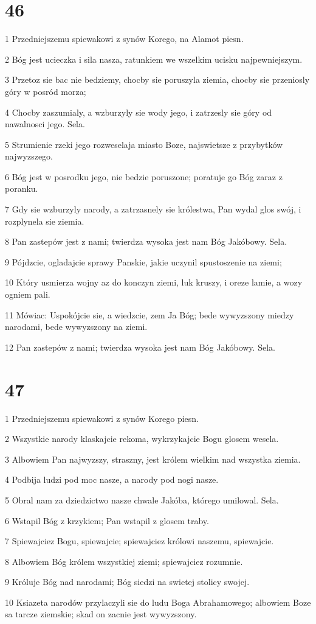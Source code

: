 \chapter{46}

\par 1 Przedniejszemu spiewakowi z synów Korego, na Alamot piesn.
\par 2 Bóg jest ucieczka i sila nasza, ratunkiem we wszelkim ucisku najpewniejszym.
\par 3 Przetoz sie bac nie bedziemy, chocby sie poruszyla ziemia, chocby sie przeniosly góry w posród morza;
\par 4 Chocby zaszumialy, a wzburzyly sie wody jego, i zatrzesly sie góry od nawalnosci jego. Sela.
\par 5 Strumienie rzeki jego rozweselaja miasto Boze, najswietsze z przybytków najwyzszego.
\par 6 Bóg jest w posrodku jego, nie bedzie poruszone; poratuje go Bóg zaraz z poranku.
\par 7 Gdy sie wzburzyly narody, a zatrzasnely sie królestwa, Pan wydal glos swój, i rozplynela sie ziemia.
\par 8 Pan zastepów jest z nami; twierdza wysoka jest nam Bóg Jakóbowy. Sela.
\par 9 Pójdzcie, ogladajcie sprawy Panskie, jakie uczynil spustoszenie na ziemi;
\par 10 Który usmierza wojny az do konczyn ziemi, luk kruszy, i oreze lamie, a wozy ogniem pali.
\par 11 Mówiac: Uspokójcie sie, a wiedzcie, zem Ja Bóg; bede wywyzszony miedzy narodami, bede wywyzszony na ziemi.
\par 12 Pan zastepów z nami; twierdza wysoka jest nam Bóg Jakóbowy. Sela.

\chapter{47}

\par 1 Przedniejszemu spiewakowi z synów Korego piesn.
\par 2 Wszystkie narody klaskajcie rekoma, wykrzykajcie Bogu glosem wesela.
\par 3 Albowiem Pan najwyzszy, straszny, jest królem wielkim nad wszystka ziemia.
\par 4 Podbija ludzi pod moc nasze, a narody pod nogi nasze.
\par 5 Obral nam za dziedzictwo nasze chwale Jakóba, którego umilowal. Sela.
\par 6 Wstapil Bóg z krzykiem; Pan wstapil z glosem traby.
\par 7 Spiewajciez Bogu, spiewajcie; spiewajciez królowi naszemu, spiewajcie.
\par 8 Albowiem Bóg królem wszystkiej ziemi; spiewajciez rozumnie.
\par 9 Króluje Bóg nad narodami; Bóg siedzi na swietej stolicy swojej.
\par 10 Ksiazeta narodów przylaczyli sie do ludu Boga Abrahamowego; albowiem Boze sa tarcze ziemskie; skad on zacnie jest wywyzszony.

